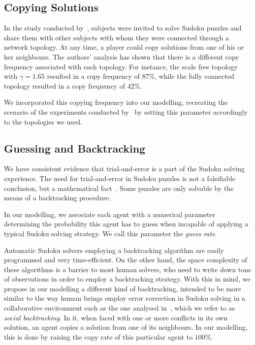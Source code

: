 \documentclass{article}
\begin{document}
\subsection{Copying Solutions}

In the study conducted by~\cite{farenzena:collabem}, subjects were invited to solve Sudoku puzzles and share them with other subjects with whom they were connected through a network topology. At any time, a player could copy solutions from one of his or her neighbours. The authors' analysis has shown that there is a different copy frequency associated with each topology. For instance, the scale free topology with $\gamma = 1.65$ resulted in a copy frequency of $87 \%$, while the fully connected topology resulted in a copy frequency of $42 \%$.

We incorporated this copying frequency into our modelling, recreating the scenario of the experiments conducted by~\cite{farenzena:collabem} by setting this parameter accordingly to the topologies we used.

\subsection{Guessing and Backtracking}

We have consistent evidence that trial-and-error is a part of the Sudoku solving experience. The need for trial-and-error in Sudoku puzzles is not a falsifiable conclusion, but a mathematical fact~\cite{davis:mathsudoku}. Some puzzles are only solvable by the means of a backtracking procedure.

In our modelling, we associate each agent with a numerical parameter determining the probability this agent has to guess when incapable of applying a typical Sudoku solving strategy. We call this parameter the \emph{guess rate}.

Automatic Sudoku solvers employing a backtracking algorithm are easily programmed and very time-efficient. On the other hand, the space complexity of these algorithms is a barrier to most human solvers, who need to write down tons of observations in order to employ a backtracking strategy. With this in mind, we propose in our modelling a different kind of backtracking, intended to be more similar to the way human beings employ error correction in Sudoku solving in a collaborative environment such as the one analysed in~\cite{farenzena:collabem}, which we refer to as \emph{social backtracking}. In it, when faced with one or more conflicts in its own solution, an agent copies a solution from one of its neighbours. In our modelling, this is done by raising the copy rate of this particular agent to $100 \%$.
\end{document}
